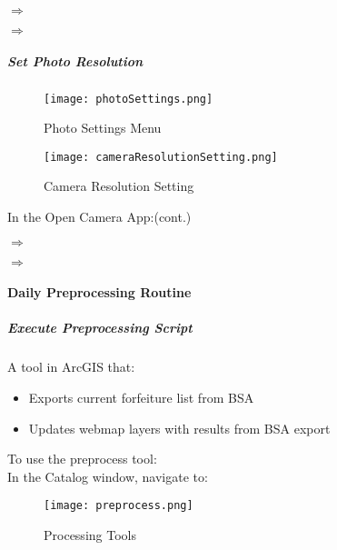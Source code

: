{\LARGE\noindent{}  $\Rightarrow$}
\vspace{3in}

{\LARGE\noindent{}  $\Rightarrow$}
\clearpage
\subparagraph*{Set Photo Resolution}
\begin{wrapfigure}{r}{0.5\textwidth}
\centering
    \texttt{[image: photoSettings.png]}
\vspace{-.1in}

\caption{Photo Settings Menu}

\vspace{-.1in}

\HRule %
\vspace{.05in}

    \texttt{[image: cameraResolutionSetting.png]}
\vspace{-.1in}

\caption{Camera Resolution Setting}
\end{wrapfigure}
In the Open Camera App:{\tiny (cont.)}
\vspace{.2in}

{\LARGE\noindent{}  $\Rightarrow$}
\vspace{6.5in}

{\LARGE\noindent{}  $\Rightarrow$}
\clearpage
\paragraph{Daily Preprocessing Routine}
\subparagraph{Execute Preprocessing Script}A tool in ArcGIS that:
\begin{itemize}
\item Exports current forfeiture list from BSA
\item Updates webmap layers with results from BSA export
\end{itemize}
To use the preprocess tool:\\
In the Catalog window, navigate to:

{\scriptsize{}}

%
%

\begin{wrapfigure}{r}{0.5\textwidth}
\centering
    \texttt{[image: preprocess.png]}
\vspace{-.1in}

\caption{Processing Tools}
\end{wrapfigure}
\vspace{.5in}

